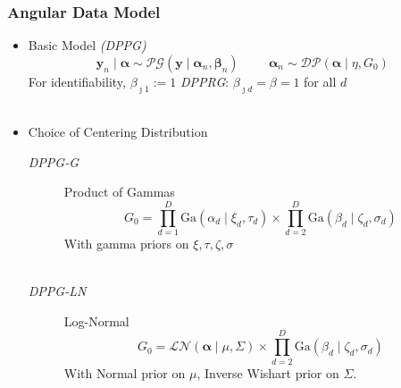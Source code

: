 \documentclass[aspectratio=169,10pt,notes]{beamer}
\begin{document}
\begin{frame}
    \frametitle{Angular Data Model}
    \label{pgpareto:angulardatamodel}
    {\small
    \begin{itemize}
    \item Basic Model \emph{(DPPG)}
        \[
            \bm{y}_n\mid\bm{\alpha} \sim 
            \mathcal{PG}\left(\bm{y}\mid\bm{\alpha}_n,\bm{\beta}_n\right)
            \hspace{1cm}
            \bm{\alpha}_n \sim 
            \mathcal{DP}(\bm{\alpha}\mid\eta, G_0)
        \]
        For identifiability, $\beta_{\jmath 1} := 1$\hspace{1cm}
            \emph{DPPRG}: $\beta_{\jmath d} = \beta = 1$ for all $d$\\~
    \item Choice of Centering Distribution
        \begin{description}
            \item[\emph{DPPG-G}] Product of Gammas
                \[
                G_0 = \prod_{d = 1}^D\text{Ga}\left(\alpha_d\mid \xi_d,\tau_d\right)
                \times\prod_{d=2}^D\text{Ga}\left(\beta_d\mid \zeta_d,\sigma_d\right)
                \]
                With gamma priors on $\xi,\tau,\zeta,\sigma$\\~
            \item[\emph{DPPG-LN}] Log-Normal
                \[
                G_0 = \mathcal{LN}\left(\bm{\alpha}\mid\mu,\Sigma\right) \times \prod_{d = 2}^D\text{Ga}\left(\beta_d\mid \zeta_d,\sigma_d\right)
                \]
                With Normal prior on $\mu$, Inverse Wishart prior on $\Sigma$.
        \end{description}
    \end{itemize}
    }
    \hyperlink{pgpareto:pginference}{}
\end{frame} %

\end{document}
